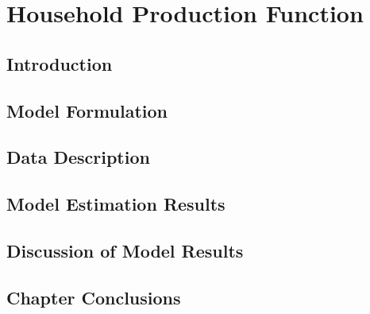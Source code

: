 \chapter{Household Production Function}
\section{Introduction}

\section{Model Formulation}

\section{Data Description}

\section{Model Estimation Results}

\section{Discussion of Model Results}

\section{Chapter Conclusions}